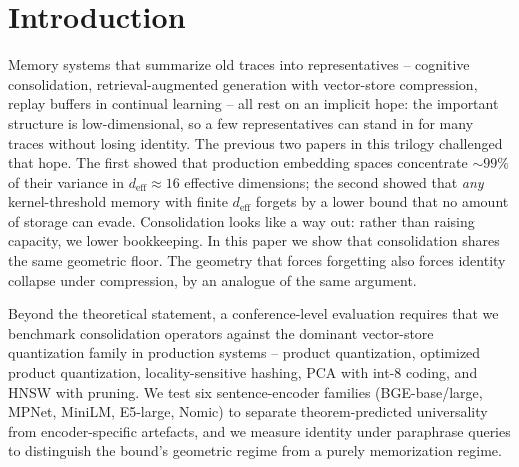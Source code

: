 \documentclass[11pt]{article}
\theoremstyle{definition}
\theoremstyle{remark}
\newcommand{\deff}{d_{\mathrm{eff}}}
\begin{document}
\section*{Introduction}

Memory systems that summarize old traces into representatives -- cognitive
consolidation\cite{mcclellandConsolidation1995,alvarezSquireConsolidation1994},
retrieval-augmented generation with vector-store compression\cite{lewisRAG2020},
replay buffers in continual learning\cite{robinsReplay1995} -- all rest on an
implicit hope: the important structure is low-dimensional, so a few
representatives can stand in for many traces without losing identity.
The previous two papers in this trilogy challenged that hope. The first showed
that production embedding spaces concentrate $\sim 99\%$ of their variance in
$\deff \approx 16$ effective dimensions\cite{geometryOfForgetting2026};
the second showed that \emph{any} kernel-threshold memory with finite $\deff$
forgets by a lower bound that no amount of storage can
evade\cite{priceOfMeaning2026}. Consolidation looks like a way out: rather
than raising capacity, we lower bookkeeping. In this paper we show that
consolidation shares the same geometric floor. The geometry that forces
forgetting also forces identity collapse under compression, by an analogue
of the same argument.

Beyond the theoretical statement, a conference-level evaluation requires that
we benchmark consolidation operators against the dominant vector-store
quantization family in production systems -- product
quantization\cite{jegouPQ2011}, optimized product
quantization\cite{ge2013optimized}, locality-sensitive
hashing\cite{charikarLSH2002}, PCA with int-8 coding, and HNSW with pruning.
We test six sentence-encoder families
(BGE-base/large\cite{xiao2023bge}, MPNet\cite{song2020mpnet},
MiniLM\cite{wang2020minilm}, E5-large\cite{wang2022e5},
Nomic\cite{nussbaum2024nomic}) to separate theorem-predicted universality
from encoder-specific artefacts, and we measure identity under
paraphrase queries to distinguish the bound's geometric regime from a
purely memorization regime.
\end{document}
